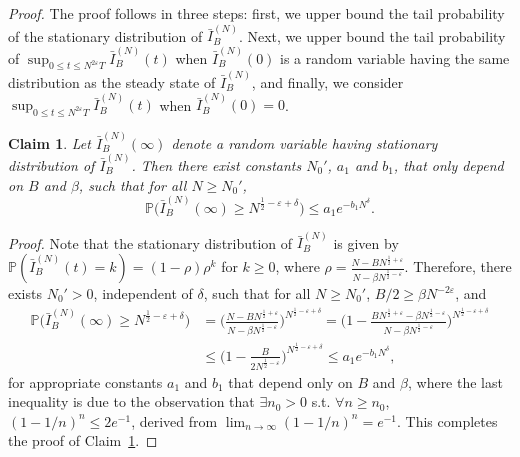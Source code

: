 \documentclass[11pt, reqno]{article}
\newtheorem{claim}[theorem]{Claim}
\numberwithin{equation}{section}
\numberwithin{theorem}{section}
\newcommand\blue[1]{#1}
\begin{document}
\begin{proof}
The proof follows in three steps: first, we upper bound the tail probability of the stationary distribution of $\bar{I}^{(N)}_B$. Next, we upper bound the tail probability of $\sup_{0\leq t\leq N^{2\varepsilon }T}\bar{I}^{(N)}_B(t)$ when $\bar{I}^{(N)}_B(0)$ is a random variable having the same distribution as the steady state of $\bar{I}^{(N)}_B$, and finally, we consider $\sup_{0\leq t\leq N^{2\varepsilon }T}\bar{I}^{(N)}_B(t)$ when $\bar{I}^{(N)}_B(0)=0$.

\begin{claim}\label{claim:6.2}
Let $\bar{I}^{(N)}_B(\infty)$ denote a random variable having stationary distribution of $\bar{I}^{(N)}_B$. 
Then there exist constants $N_0'$, $a_1$ and $b_1$, that only depend on $B$ and $\beta$, such that for all $N\geq N_0'$,  
$$\mathbb{P}\big(\bar{I}^{(N)}_B(\infty)\geq N^{\frac{1}{2}-\varepsilon+\delta}\big)\leq a_1 e^{-b_1N^{\delta}}.$$ 
\end{claim}
\emph{Proof.}
 Note that the stationary distribution of $\bar{I}^{(N)}_B$ is given by $\mathbb{P}(\bar{I}^{(N)}_B(t)=k)=(1-\rho)\rho^{k}$ for $k\geq 0$, where $\rho=\frac{N-B N^{\frac{1}{2}+\varepsilon}}{N-\beta N^{\frac{1}{2}-\varepsilon}}$.
 Therefore, there exists $N_0'>0$\blue{, independent of $\delta$, } such that for all $N\geq N_0'$, \blue{$B/2\ge \beta N^{-2\varepsilon}$, and }
 \blue{\begin{equation}\label{eq:Idle-B-maximal}
     \begin{split}
\mathbb{P}\big(\bar{I}^{(N)}_B(\infty)\geq N^{\frac{1}{2}-\varepsilon+\delta}\big)
 &=\Big(\frac{N-B N^{\frac{1}{2}+\varepsilon}}{N-\beta N^{\frac{1}{2}-\varepsilon}}\Big)^{N^{\frac{1}{2}-\varepsilon+\delta}}
 =\Big(1-\frac{B N^{\frac{1}{2}+\varepsilon}-\beta N^{\frac{1}{2}-\varepsilon}}{N-\beta N^{\frac{1}{2}-\varepsilon}}\Big)^{N^{\frac{1}{2}-\varepsilon+\delta}}\\
 &\leq \Big(1-\frac{B }{2N^{\frac{1}{2}-\varepsilon}}\Big)^{N^{\frac{1}{2}-\varepsilon+\delta}}\leq a_1 e^{-b_1N^{\delta}},
     \end{split}
 \end{equation}}
 for appropriate constants $a_1$ and $b_1$ that depend only on $B$ and $\beta$\blue{, where the last inequality is due to the observation that $\exists n_0>0$ s.t. $\forall n\geq n_0$, $(1-1/n)^n\leq 2e^{-1}$, derived from $\lim_{n\rightarrow\infty}(1-1/n)^n=e^{-1}$}.
This completes the proof of Claim~\ref{claim:6.2}.


\end{proof}
\end{document}
